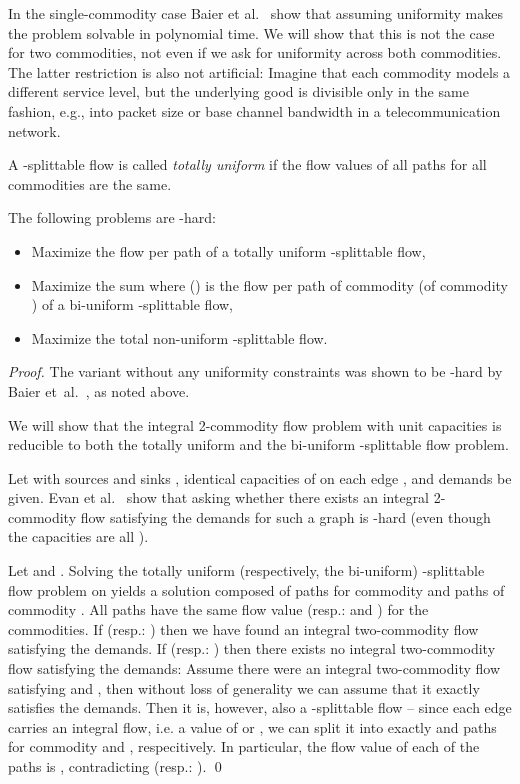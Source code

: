 In the single-commodity case Baier et
al.~\cite{baier-koehler-skutella:05} show that assuming uniformity
makes the problem solvable in polynomial time. We will show that this
is not the case for two commodities, not even if we ask for uniformity across
both commodities. The latter restriction is also not artificial: Imagine
that each commodity models a different service level, but the
underlying good is divisible only in the same fashion, e.g., into
packet size or base channel bandwidth in a telecommunication network.

\begin{definition}
  A -splittable flow is called \emph{totally uniform} if the flow
  values of all paths for all commodities are the same.
\end{definition}

\begin{lemma}
  The following problems are \NP-hard:
  \begin{itemize}
  \item Maximize the flow per path of a totally uniform 
    -splittable flow,
  \item Maximize the sum  where  () is the flow per path of
    commodity  (of commodity ) of a bi-uniform
    -splittable flow,
  \item  Maximize the total non-uniform -splittable
    flow.
  \end{itemize}
\end{lemma}

\begin{proof}
  The variant without any uniformity constraints was shown to be \NP-hard
  by Baier et~al.~\cite{baier-koehler-skutella:05}, as noted above.

  We will show that the integral 2-commodity flow problem with unit
  capacities is reducible to both the totally uniform and the
  bi-uniform -splittable flow problem.
  
  Let  with sources  and sinks , identical
  capacities of  on each edge , and demands 
  be given. Evan et al.~\cite{even-itai-shamir:76} show that asking
  whether there exists an integral 2-commodity flow satisfying the
  demands for such a graph is \NP-hard (even
  though  the capacities are all ). 

  Let  and . Solving the totally uniform
  (respectively, the bi-uniform) -splittable flow problem on
   yields a solution composed of  paths for commodity  and
   paths of commodity . All paths have the same flow value 
  (resp.:  and ) for the commodities. If  (resp.: )
  then we have found an integral two-commodity flow satisfying the
  demands.  If  (resp.: ) then there exists no
  integral two-commodity flow satisfying the demands: Assume there
  were an integral two-commodity flow satisfying  and , then
  without loss of generality we can assume that it exactly satisfies
  the demands. Then it is, however, also a -splittable flow
  -- since each edge carries an integral flow, i.e. a value of  or ,
  we can split it into exactly  and  paths for commodity 
  and , respecitively.  In particular, the flow value of each of
  the paths is , contradicting  (resp.: ).
\qed\end{proof}

